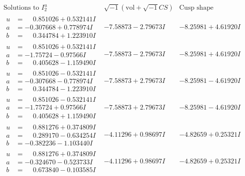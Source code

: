\documentclass[1p]{elsarticle_modified}
\theoremstyle{definition}
\newcommand{\I}{\sqrt{-1}}
\begin{document}
$$\begin{array}{c|c|c}  
\text{Solutions to }I^u_{2}& \I (\text{vol} + \sqrt{-1}CS) & \text{Cusp shape}\\
 \hline 
\begin{aligned}
u &= \phantom{-}0.851026 + 0.532141 I \\
a &= -0.307668 + 0.778974 I \\
b &= \phantom{-}0.344784 + 1.223910 I\end{aligned}
 & -7.58873 - 2.79673 I & -8.25981 + 4.61920 I \\ \hline\begin{aligned}
u &= \phantom{-}0.851026 + 0.532141 I \\
a &= -1.75724 - 0.97566 I \\
b &= \phantom{-}0.405628 - 1.159490 I\end{aligned}
 & -7.58873 - 2.79673 I & -8.25981 + 4.61920 I \\ \hline\begin{aligned}
u &= \phantom{-}0.851026 - 0.532141 I \\
a &= -0.307668 - 0.778974 I \\
b &= \phantom{-}0.344784 - 1.223910 I\end{aligned}
 & -7.58873 + 2.79673 I & -8.25981 - 4.61920 I \\ \hline\begin{aligned}
u &= \phantom{-}0.851026 - 0.532141 I \\
a &= -1.75724 + 0.97566 I \\
b &= \phantom{-}0.405628 + 1.159490 I\end{aligned}
 & -7.58873 + 2.79673 I & -8.25981 - 4.61920 I \\ \hline\begin{aligned}
u &= \phantom{-}0.881276 + 0.374809 I \\
a &= \phantom{-}0.289170 - 0.634254 I \\
b &= -0.382236 - 1.103440 I\end{aligned}
 & -4.11296 + 0.98697 I & -4.82659 + 0.25321 I \\ \hline\begin{aligned}
u &= \phantom{-}0.881276 + 0.374809 I \\
a &= -0.324670 - 0.523733 I \\
b &= \phantom{-}0.673840 - 0.103585 I\end{aligned}
 & -4.11296 + 0.98697 I & -4.82659 + 0.25321 I \\ \hline\begin{aligned}

\end{aligned}
\end{array}$$
\end{document}
